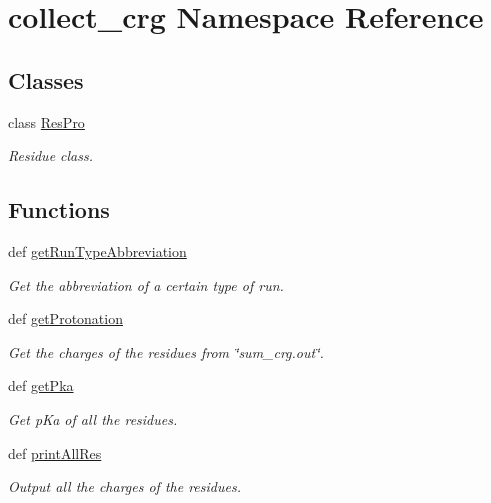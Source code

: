 \hypertarget{namespacecollect__crg}{\section{collect\-\_\-crg Namespace Reference}
\label{namespacecollect__crg}
}
\subsection*{Classes}
\begin{DoxyCompactItemize}
\item 
class \hyperlink{classcollect__crg_1_1_res_pro}{Res\-Pro}
\begin{DoxyCompactList}\small\item\em Residue class. \end{DoxyCompactList}\end{DoxyCompactItemize}
\subsection*{Functions}
\begin{DoxyCompactItemize}
\item 
def \hyperlink{namespacecollect__crg_a33321885da8a4722e057bede7c62c1df}{get\-Run\-Type\-Abbreviation}
\begin{DoxyCompactList}\small\item\em Get the abbreviation of a certain type of run. \end{DoxyCompactList}\item 
def \hyperlink{namespacecollect__crg_af11a3f33c17f31a30197d715ebaa3690}{get\-Protonation}
\begin{DoxyCompactList}\small\item\em Get the charges of the residues from \char`\"{}sum\-\_\-crg.\-out\char`\"{}. \end{DoxyCompactList}\item 
def \hyperlink{namespacecollect__crg_a63215cbd9474ee4d556a45ef630b3c3d}{get\-Pka}
\begin{DoxyCompactList}\small\item\em Get p\-Ka of all the residues. \end{DoxyCompactList}\item 
def \hyperlink{namespacecollect__crg_ae1af2a9da6043f854ab344fb6c4f8dab}{print\-All\-Res}
\begin{DoxyCompactList}\small\item\em Output all the charges of the residues. \end{DoxyCompactList}\end{DoxyCompactItemize}
